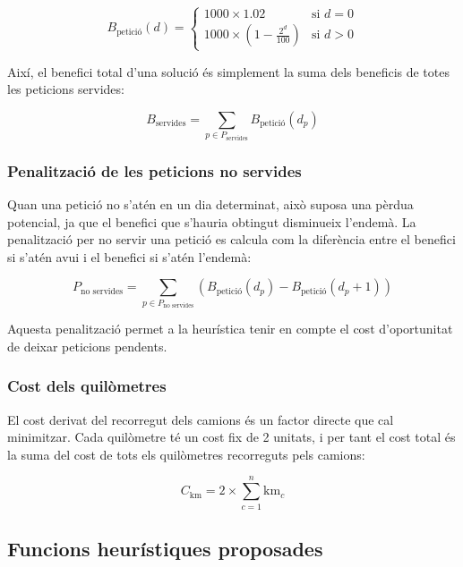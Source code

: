 \begin{equation}
B_{\text{petició}}(d) = 
\begin{cases}
1000 \times 1.02 & \text{si } d = 0 \\
1000 \times \left(1 - \frac{2^d}{100}\right) & \text{si } d > 0
\end{cases}
\label{eq:benefici-peticio}
\end{equation}

Així, el benefici total d’una solució és simplement la suma dels beneficis de totes les peticions servides:

\begin{equation}
B_{\text{servides}} = \sum_{p \in P_{\text{servides}}} B_{\text{petició}}(d_p)
\end{equation}

\subsubsection{Penalització de les peticions no servides}

Quan una petició no s’atén en un dia determinat, això suposa una pèrdua potencial, ja que el benefici que s’hauria obtingut disminueix l’endemà. La penalització per no servir una petició es calcula com la diferència entre el benefici si s’atén avui i el benefici si s’atén l’endemà:

\begin{equation}
P_{\text{no servides}} = \sum_{p \in P_{\text{no servides}}} \left(B_{\text{petició}}(d_p) - B_{\text{petició}}(d_p + 1)\right)
\end{equation}

Aquesta penalització permet a la heurística tenir en compte el cost d’oportunitat de deixar peticions pendents.

\subsubsection{Cost dels quilòmetres}

El cost derivat del recorregut dels camions és un factor directe que cal minimitzar. Cada quilòmetre té un cost fix de 2 unitats, i per tant el cost total és la suma del cost de tots els quilòmetres recorreguts pels camions:

\begin{equation}
C_{\text{km}} = 2 \times \sum_{c=1}^{n} \text{km}_c
\end{equation}

\subsection{Funcions heurístiques proposades}

